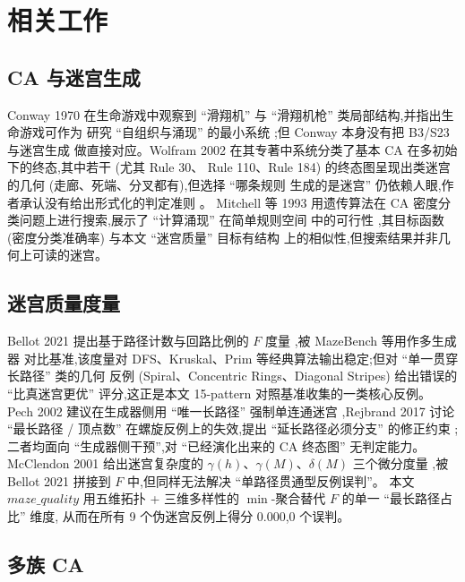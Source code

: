 
\section{相关工作}
\label{sec:related}

\subsection{CA 与迷宫生成}

Conway 1970 在生命游戏中观察到 ``滑翔机'' 与 ``滑翔机枪'' 类局部结构,并指出生命游戏可作为
研究 ``自组织与涌现'' 的最小系统 \cite{conway1970};但 Conway 本身没有把 B3/S23 与迷宫生成
做直接对应。Wolfram 2002 在其专著中系统分类了基本 CA 在多初始下的终态,其中若干 (尤其 Rule 30、
Rule 110、Rule 184) 的终态图呈现出类迷宫的几何 (走廊、死端、分叉都有),但选择 ``哪条规则
生成的是迷宫'' 仍依赖人眼,作者承认没有给出形式化的判定准则 \cite{wolfram2002}。
Mitchell 等 1993 用遗传算法在 CA 密度分类问题上进行搜索,展示了 ``计算涌现'' 在简单规则空间
中的可行性 \cite{mitchell1993},其目标函数 (密度分类准确率) 与本文 ``迷宫质量'' 目标有结构
上的相似性,但搜索结果并非几何上可读的迷宫。

\subsection{迷宫质量度量}

Bellot 2021 提出基于路径计数与回路比例的 $F$ 度量 \cite{bellot2021},被 MazeBench 等用作多生成器
对比基准,该度量对 DFS、Kruskal、Prim 等经典算法输出稳定;但对 ``单一贯穿长路径'' 类的几何
反例 (Spiral、Concentric Rings、Diagonal Stripes) 给出错误的 ``比真迷宫更优'' 评分,这正是本文
15-pattern 对照基准收集的一类核心反例。
Pech 2002 建议在生成器侧用 ``唯一长路径'' 强制单连通迷宫 \cite{pech2002},Rejbrand 2017
讨论 ``最长路径 / 顶点数'' 在螺旋反例上的失效,提出 ``延长路径必须分支'' 的修正约束 \cite{rejbrand2017};
二者均面向 ``生成器侧干预'',对 ``已经演化出来的 CA 终态图'' 无判定能力。
McClendon 2001 给出迷宫复杂度的 $\gamma(h)$、$\gamma(M)$、$\delta(M)$ 三个微分度量
\cite{mcclendon2001},被 Bellot 2021 拼接到 $F$ 中,但同样无法解决 ``单路径贯通型反例误判''。
本文 $maze\_quality$ 用五维拓扑 + 三维多样性的 $\min$-聚合替代 $F$ 的单一 ``最长路径占比'' 维度,
从而在所有 9 个伪迷宫反例上得分 $0.000$,0 个误判。

\subsection{多族 CA}

